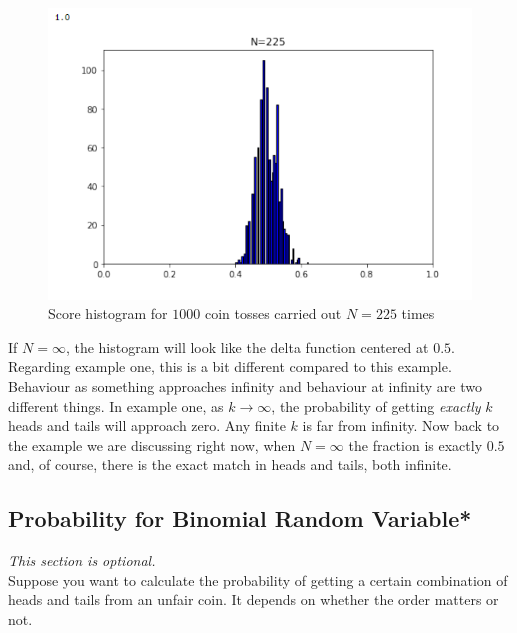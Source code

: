 \documentclass[12pt, a4paper]{article}
\newcounter{exa}
\begin{document}
\begin{figure}[H]
\centering
\includegraphics[width=140mm]{3.png}
\caption{Score histogram for $1000$ coin tosses carried out $N=225$ times}
\end{figure}

If $N = \infty$, the histogram will look like the delta function centered at $0.5$. \\

Regarding example one, this is a bit different compared to this example. Behaviour as something approaches infinity and behaviour at infinity are two different things. In example one, as $k\to\infty$, the probability of getting \textit{exactly} $k$ heads and tails will approach zero. Any finite $k$ is far from infinity. Now back to the example we are discussing right now, when $N = \infty$ the fraction is exactly $0.5$ and, of course, there is the exact match in heads and tails, both infinite.

\subsection{Probability for Binomial Random Variable*}

\textit{This section is optional.} \\

Suppose you want to calculate the probability of getting a certain combination of heads and tails from an unfair coin. It depends on whether the order matters or not.
\end{document}
